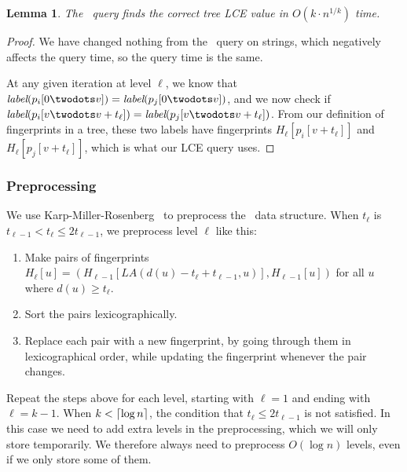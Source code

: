 \documentclass[a4]{article}
\newtheorem{lemma}{Lemma}
\begin{document}
\begin{lemma}
The \tfprintk\ query finds the correct tree LCE value in $O(k\cdot n^{1/k})$ time.
\end{lemma}
\begin{proof}
We have changed nothing from the \fprintk\ query on strings, which negatively affects the query time, so the query time is the same.


At any given iteration at level $\ell$, we know that $\zlabel(p_i[0\twodots v])=\zlabel(p_j[0\twodots v])$, and we now check if $\zlabel(p_i[v\twodots v+t_\ell])=\zlabel(p_j[v\twodots v+t_\ell])$. From our definition of fingerprints in a tree, these two labels have fingerprints $H_\ell[p_i[v+t_\ell]]$ and $H_\ell[p_j[v+t_\ell]]$, which is what our LCE query uses.
\end{proof}

\subsubsection{Preprocessing}

We use Karp-Miller-Rosenberg~\cite{karp-miller-rosenberg} to preprocess the \tfprintk\ data structure. When $t_\ell$ is $t_{\ell-1} < t_\ell \leq 2t_{\ell-1}$, we preprocess level $\ell$ like this:
\begin{enumerate}
\item Make pairs of fingerprints $H_\ell[u] = (H_{\ell-1}[LA(d(u)-t_\ell+t_{\ell-1},u)], H_{\ell-1}[u])$ for all $u$ where $d(u) \geq t_\ell$.
\item Sort the pairs lexicographically.
\item Replace each pair with a new fingerprint, by going through them in lexicographical order, while updating the fingerprint whenever the pair changes.
\end{enumerate}

Repeat the steps above for each level, starting with $\ell = 1$ and ending with $\ell = k-1$. When $k < \lceil\log n\rceil$, the condition that $t_\ell \leq 2t_{\ell-1}$ is not satisfied. In this case we need to add extra levels in the preprocessing, which we will only store temporarily. We therefore always need to preprocess $O(\log n)$ levels, even if we only store some of them.
\end{document}
